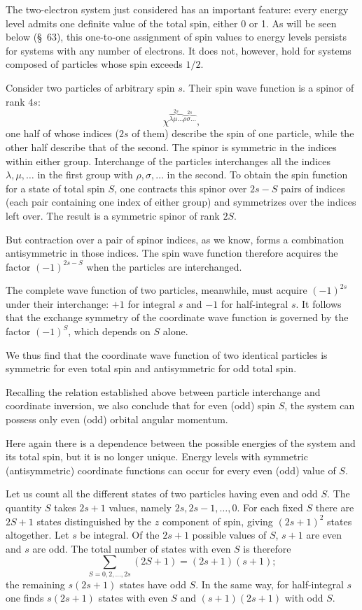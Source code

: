 The two-electron system just considered has an important feature: every energy level admits one definite value of the total spin, either 0 or 1. As will be seen below (§~63), this one-to-one assignment of spin values to energy levels persists for systems with any number of electrons. It does not, however, hold for systems composed of particles whose spin exceeds $1/2$.

Consider two particles of arbitrary spin $s$. Their spin wave function is a spinor of rank $4s$:
\[
 \chi^{\overbrace{\lambda\mu\ldots}^{2s}\overbrace{\rho\sigma\ldots}^{2s}},
\]
one half of whose indices ($2s$ of them) describe the spin of one particle, while the other half describe that of the second. The spinor is symmetric in the indices within either group. Interchange of the particles interchanges all the indices $\lambda,\mu,\ldots$ in the first group with $\rho,\sigma,\ldots$ in the second. To obtain the spin function for a state of total spin $S$, one contracts this spinor over $2s-S$ pairs of indices (each pair containing one index of either group) and symmetrizes over the indices left over. The result is a symmetric spinor of rank $2S$.

But contraction over a pair of spinor indices, as we know, forms a combination antisymmetric in those indices. The spin wave function therefore acquires the factor $(-1)^{2s-S}$ when the particles are interchanged.

The complete wave function of two particles, meanwhile, must acquire $(-1)^{2s}$ under their interchange: $+1$ for integral $s$ and $-1$ for half-integral $s$. It follows that the exchange symmetry of the coordinate wave function is governed by the factor $(-1)^S$, which depends on $S$ alone.

We thus find that the coordinate wave function of two identical particles is symmetric for even total spin and antisymmetric for odd total spin.

Recalling the relation established above between particle interchange and coordinate inversion, we also conclude that for even (odd) spin $S$, the system can possess only even (odd) orbital angular momentum.

Here again there is a dependence between the possible energies of the system and its total spin, but it is no longer unique. Energy levels with symmetric (antisymmetric) coordinate functions can occur for every even (odd) value of $S$.

Let us count all the different states of two particles having even and odd $S$. The quantity $S$ takes $2s+1$ values, namely $2s,2s-1,\ldots,0$. For each fixed $S$ there are $2S+1$ states distinguished by the $z$ component of spin, giving $(2s+1)^2$ states altogether. Let $s$ be integral. Of the $2s+1$ possible values of $S$, $s+1$ are even and $s$ are odd. The total number of states with even $S$ is therefore
\[
 \sum_{S=0,2,\ldots,2s}(2S+1)=(2s+1)(s+1);
\]
the remaining $s(2s+1)$ states have odd $S$. In the same way, for half-integral $s$ one finds $s(2s+1)$ states with even $S$ and $(s+1)(2s+1)$ with odd $S$.

